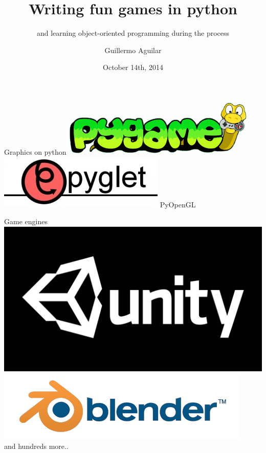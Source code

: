 \documentclass[10pt]{beamer}
\title
{Writing fun games in python}
\subtitle
{and learning object-oriented programming during the process} %
\author %
{Guillermo Aguilar}
\institute[MKP] %
{}
\date
{October 14th, 2014}
\begin{document}
\begin{frame}
  \titlepage
\end{frame}

\begin{frame}{Graphics on python}
\center
\includegraphics[scale=0.4]{Pygame_logo.png} \quad \quad
\includegraphics[scale=0.4]{Pyglet-Logo.jpg}
\vfill
\huge{PyOpenGL}
\end{frame}

\begin{frame}{Game engines}
\center
\includegraphics[scale=0.1]{Unity-Logo.jpg} \quad \quad
\includegraphics[scale=0.4]{blender-plain.png} \\[20pt]
and hundreds more.. \href{http://en.wikipedia.org/wiki/List_of_game_engines}{}


\end{frame}
\end{document}
